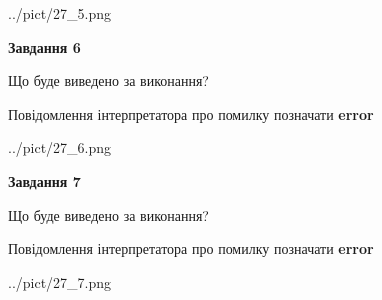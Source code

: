 \documentclass[10pt, ukrainian]{article}
\begin{document}
{\begin {large}
\begin{center}
	{../pict/27_5.png}
\end{center}
\newpage

{\begin {center}\textbf{Завдання 6}\end {center}}\par
Що буде виведено за виконання? \par
Повідомлення інтерпретатора про помилку позначати \textbf{error}

\begin{center}
	{../pict/27_6.png}
\end{center}
\newpage

{\begin {center}\textbf{Завдання 7}\end {center}}\par
Що буде виведено за виконання? \par
Повідомлення інтерпретатора про помилку позначати \textbf{error}

\begin{center}
	{../pict/27_7.png}
\end{center}
\newpage

\end {large}}
\end{document}
